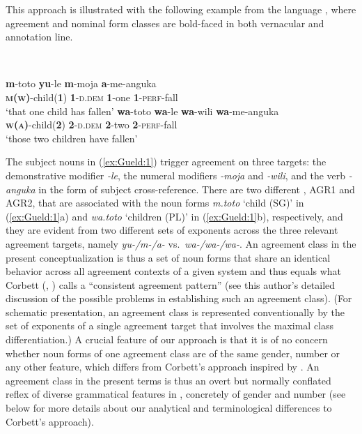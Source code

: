 \documentclass[output=collectionpaper]{langsci/langscibook}
\begin{document}
This approach is illustrated with the following example from the  language , where agreement and nominal form classes are bold-faced in both vernacular and annotation line.

\ea%
    \label{ex:Gueld:1}
\\
\begin{xlist}
\ex
\gll \textbf{m}{}-toto  \textbf{yu}{}-le  \textbf{m}{}-moja  \textbf{a}{}-me-anguka\\
     \textbf{\textsc{m(w)}}{}-child(\textbf{1})  \textbf{1}{}-\textsc{d.dem}  \textbf{1}{}-one  \textbf{1}{}-\textsc{perf}{}-fall\\
\glt `that one child has fallen'
\ex
\gll \textbf{wa}{}-toto  \textbf{wa}{}-le  \textbf{wa}{}-wili  \textbf{wa}{}-me-anguka\\
     \textbf{\textsc{w(a)}}{}-child(\textbf{2})  \textbf{2}{}-\textsc{d.dem}  \textbf{2}{}-two  \textbf{2}{}-\textsc{perf}{}-fall\\
\glt `those two children have fallen'
\end{xlist}
\z

The subject nouns in (\ref{ex:Gueld:1}) trigger agreement on three targets: the demonstrative modifier \textit{{}-le}, the numeral modifiers \textit{{}-moja} and \textit{{}-wili}, and the verb \textit{{}-anguka} in the form of subject cross-reference. There are two different , AGR1 and AGR2, that are associated with the noun forms \textit{m.toto} `child (SG)' in (\ref{ex:Gueld:1}a) and \textit{wa.toto} `children (PL)' in (\ref{ex:Gueld:1}b), respectively, and they are evident from two different sets of exponents across the three relevant agreement targets, namely \textit{yu-/m-/a-} vs.\ \textit{wa-/wa-/wa-}. An agreement class in the present conceptualization is thus a set of noun forms that share an identical behavior across all agreement contexts of a given system and thus equals what Corbett (\citeyear{Corbett1991}, \citeyear{Corbett2006}) calls a ``consistent agreement pattern'' (see this author's detailed discussion of the possible problems in establishing such an agreement class). (For schematic presentation, an agreement class is represented conventionally by the set of exponents of a single agreement target that involves the maximal class differentiation.) A crucial feature of our approach is that it is of no concern whether noun forms of one agreement class are of the same gender, number or any other feature, which differs from Corbett's approach inspired by \citet{Zaliznjak1964}. An agreement class in the present terms is thus an overt but normally conflated reflex of diverse grammatical features \textendash{} in , concretely of gender and number (see below for more details about our analytical and terminological differences to Corbett's approach).
\end{document}
